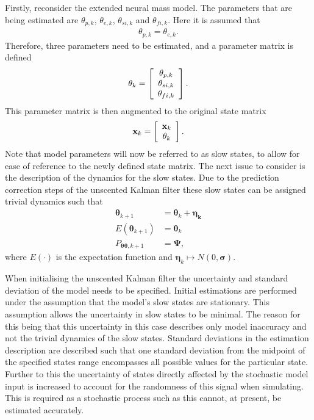 Firstly, reconsider the extended neural mass model. The parameters that are being estimated are $\theta_{p,k}$, $\theta_{e,k}$, $\theta_{si,k}$ and $\theta_{fi,k}$. Here it is assumed that \begin{align}
\theta_{p,k} = \theta_{e,k}.
\end{align} Therefore, three parameters need to be estimated, and a parameter matrix is defined
\[ \mathbf{\theta}_{k} = \left[ \begin{array}[pos]{c}
\theta_{p,k}\\
\theta_{si,k} \\
\theta_{fi,k} \end{array} \right] .\] This parameter matrix is then augmented to the original state matrix
\[ \mathbf{x}_{k} = \left[ \begin{array}[pos]{c}
\mathbf{x}_{k}\\
\mathbf{\theta}_{k} \end{array} \right] .\] Note that model parameters will now be referred to as slow states, to allow for ease of reference to the newly defined state matrix. The next issue to consider is the description of the dynamics for the slow states. Due to the prediction correction steps of the unscented Kalman filter these slow states can be assigned trivial dynamics such that
\begin{align}
\label{eqn: parameterdynamics}
\mathbf{\theta}_{k+1} &= \mathbf{\theta}_{k} + \mathbf{\eta_{k}}\\
E(\mathbf{\theta}_{k+1}) &= \mathbf{\theta}_{k}\\
P_{\mathbf{\theta} \mathbf{\theta},k+1} &= \mathbf{\Psi},
\end{align} where $E(\cdot)$ is the expectation function and $\mathbf{\eta}_{k}\longmapsto N(0,\mathbf{\sigma})$.

When initialising the unscented Kalman filter the uncertainty and standard deviation of the model needs to be specified. Initial estimations are performed under the assumption that the model's slow states are stationary. This assumption allows the uncertainty in slow states to be minimal. The reason for this being that this uncertainty in this case describes only model inaccuracy and not the trivial dynamics of the slow states. Standard deviations in the estimation description are described such that one standard deviation from the midpoint of the specified states range encompasses all possible values for the particular state. Further to this the uncertainty of states directly affected by the stochastic model input is increased to account for the randomness of this signal when simulating. This is required as a stochastic process such as this cannot, at present, be estimated accurately. 

